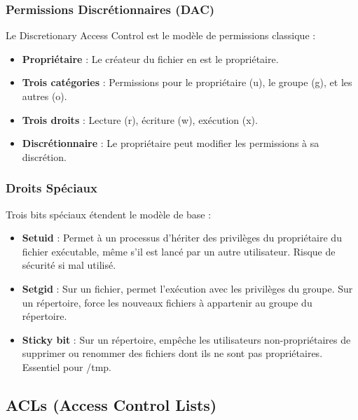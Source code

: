 \documentclass[12pt,a4paper]{article}
\begin{document}
\subsubsection{Permissions Discrétionnaires (DAC)}

Le Discretionary Access Control est le modèle de permissions classique :

\begin{itemize}
    \item \textbf{Propriétaire} : Le créateur du fichier en est le propriétaire.
    
    \item \textbf{Trois catégories} : Permissions pour le propriétaire (u), le groupe (g), et les autres (o).
    
    \item \textbf{Trois droits} : Lecture (r), écriture (w), exécution (x).
    
    \item \textbf{Discrétionnaire} : Le propriétaire peut modifier les permissions à sa discrétion.
\end{itemize}

\subsubsection{Droits Spéciaux}

Trois bits spéciaux étendent le modèle de base :

\begin{itemize}
    \item \textbf{Setuid} : Permet à un processus d'hériter des privilèges du propriétaire du fichier exécutable, même s'il est lancé par un autre utilisateur. Risque de sécurité si mal utilisé.
    
    \item \textbf{Setgid} : Sur un fichier, permet l'exécution avec les privilèges du groupe. Sur un répertoire, force les nouveaux fichiers à appartenir au groupe du répertoire.
    
    \item \textbf{Sticky bit} : Sur un répertoire, empêche les utilisateurs non-propriétaires de supprimer ou renommer des fichiers dont ils ne sont pas propriétaires. Essentiel pour /tmp.
\end{itemize}

\subsection{ACLs (Access Control Lists)}
\end{document}
